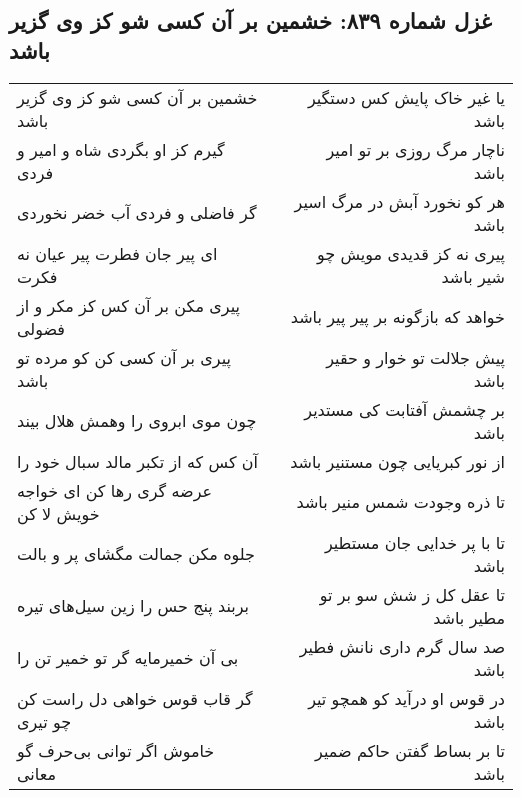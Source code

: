 \begin{center}
\section*{غزل شماره ۸۳۹: خشمین بر آن کسی شو کز وی گزیر باشد}
\label{sec:0839}
\begin{longtable}{l p{0.5cm} r}
خشمین بر آن کسی شو کز وی گزیر باشد
&&
یا غیر خاک پایش کس دستگیر باشد
\\
گیرم کز او بگردی شاه و امیر و فردی
&&
ناچار مرگ روزی بر تو امیر باشد
\\
گر فاضلی و فردی آب خضر نخوردی
&&
هر کو نخورد آبش در مرگ اسیر باشد
\\
ای پیر جان فطرت پیر عیان نه فکرت
&&
پیری نه کز قدیدی مویش چو شیر باشد
\\
پیری مکن بر آن کس کز مکر و از فضولی
&&
خواهد که بازگونه بر پیر پیر باشد
\\
پیری بر آن کسی کن کو مرده تو باشد
&&
پیش جلالت تو خوار و حقیر باشد
\\
چون موی ابروی را وهمش هلال بیند
&&
بر چشمش آفتابت کی مستدیر باشد
\\
آن کس که از تکبر مالد سبال خود را
&&
از نور کبریایی چون مستنیر باشد
\\
عرضه گری رها کن ای خواجه خویش لا کن
&&
تا ذره وجودت شمس منیر باشد
\\
جلوه مکن جمالت مگشای پر و بالت
&&
تا با پر خدایی جان مستطیر باشد
\\
بربند پنج حس را زین سیل‌های تیره
&&
تا عقل کل ز شش سو بر تو مطیر باشد
\\
بی آن خمیرمایه گر تو خمیر تن را
&&
صد سال گرم داری نانش فطیر باشد
\\
گر قاب قوس خواهی دل راست کن چو تیری
&&
در قوس او درآید کو همچو تیر باشد
\\
خاموش اگر توانی بی‌حرف گو معانی
&&
تا بر بساط گفتن حاکم ضمیر باشد
\\
\end{longtable}
\end{center}
